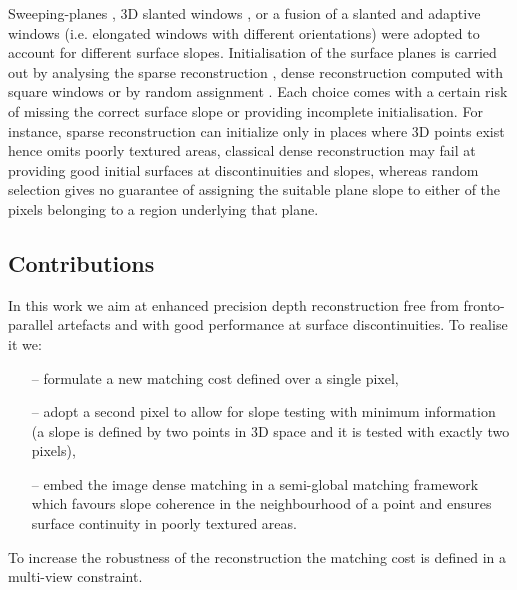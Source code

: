 \documentclass[journal]{IEEEtran}
\begin{document}
 Sweeping-planes \cite{gallup2007real}, 3D slanted windows \cite{bleyer2011patchmatch}, or a fusion of a slanted and adaptive windows (i.e. elongated windows with different orientations) \cite{buades2015reliable} were adopted to account for different surface slopes. Initialisation of the surface planes is carried out by analysing the sparse reconstruction \cite{gallup2007real}, dense reconstruction computed with square windows  \cite{yoon2006adaptive} or by random assignment \cite{bleyer2011patchmatch}. Each choice comes with a certain risk of missing the correct surface slope or providing incomplete initialisation. For instance, sparse reconstruction can initialize only in places where 3D points exist hence omits poorly textured areas, classical dense reconstruction may fail at providing good initial surfaces at discontinuities and slopes, whereas random selection gives no guarantee of assigning the suitable plane slope to either of the pixels belonging to a region underlying that plane. \\
%



\subsection{Contributions}
In this work we aim at {enhanced precision depth} reconstruction free from   {fronto-parallel artefacts} and with good performance at {surface discontinuities}. To realise it we:%

\begin{itemize}
\item[--] formulate a new matching cost defined over a single pixel,
\item[--] adopt a second pixel to allow for slope testing with minimum information (a slope is defined by two points in 3D space and it is tested with exactly two pixels),
\item[--] embed the image dense matching in a semi-global matching framework which favours slope coherence in the neighbourhood of a point and ensures surface continuity in poorly textured areas. 
\end{itemize}
To increase the robustness of the reconstruction the matching cost is defined in a multi-view constraint. 
 
\end{document}
